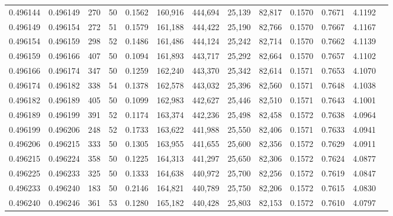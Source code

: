 \begin{tabular}{rrrrrrrrrrrrr}
0.496144 & 0.496149 & 270 &  50 &                                     0.1562 & 160,916 & 444,694 &  25,139 &  82,817 & 0.1570 & 0.7671 & 4.1192 \\
0.496149 & 0.496154 & 272 &  51 &                                     0.1579 & 161,188 & 444,422 &  25,190 &  82,766 & 0.1570 & 0.7667 & 4.1167 \\
0.496154 & 0.496159 & 298 &  52 &                                     0.1486 & 161,486 & 444,124 &  25,242 &  82,714 & 0.1570 & 0.7662 & 4.1139 \\
0.496159 & 0.496166 & 407 &  50 &                                     0.1094 & 161,893 & 443,717 &  25,292 &  82,664 & 0.1570 & 0.7657 & 4.1102 \\
0.496166 & 0.496174 & 347 &  50 &                                     0.1259 & 162,240 & 443,370 &  25,342 &  82,614 & 0.1571 & 0.7653 & 4.1070 \\
0.496174 & 0.496182 & 338 &  54 &                                     0.1378 & 162,578 & 443,032 &  25,396 &  82,560 & 0.1571 & 0.7648 & 4.1038 \\
0.496182 & 0.496189 & 405 &  50 &                                     0.1099 & 162,983 & 442,627 &  25,446 &  82,510 & 0.1571 & 0.7643 & 4.1001 \\
0.496189 & 0.496199 & 391 &  52 &                                     0.1174 & 163,374 & 442,236 &  25,498 &  82,458 & 0.1572 & 0.7638 & 4.0964 \\
0.496199 & 0.496206 & 248 &  52 &                                     0.1733 & 163,622 & 441,988 &  25,550 &  82,406 & 0.1571 & 0.7633 & 4.0941 \\
0.496206 & 0.496215 & 333 &  50 &                                     0.1305 & 163,955 & 441,655 &  25,600 &  82,356 & 0.1572 & 0.7629 & 4.0911 \\
0.496215 & 0.496224 & 358 &  50 &                                     0.1225 & 164,313 & 441,297 &  25,650 &  82,306 & 0.1572 & 0.7624 & 4.0877 \\
0.496225 & 0.496233 & 325 &  50 &                                     0.1333 & 164,638 & 440,972 &  25,700 &  82,256 & 0.1572 & 0.7619 & 4.0847 \\
0.496233 & 0.496240 & 183 &  50 &                                     0.2146 & 164,821 & 440,789 &  25,750 &  82,206 & 0.1572 & 0.7615 & 4.0830 \\
0.496240 & 0.496246 & 361 &  53 &                                     0.1280 & 165,182 & 440,428 &  25,803 &  82,153 & 0.1572 & 0.7610 & 4.0797 \\

\end{tabular}
